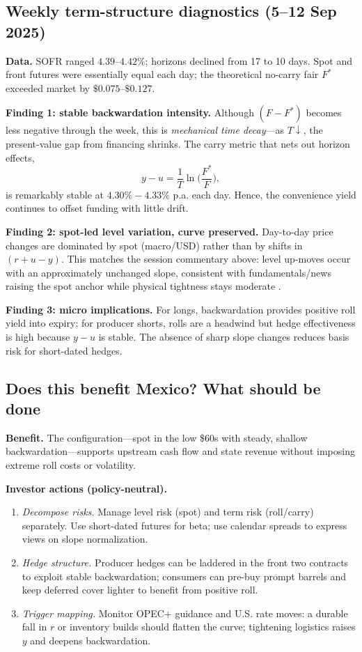 \documentclass[10pt,a4paper]{article} %
\begin{document}
\subsection{Weekly term-structure diagnostics (5–12 Sep 2025)}
\textbf{Data.} SOFR ranged \(4.39\)–\(4.42\%\); horizons declined from 17 to 10 days. Spot and front futures were essentially equal each day; the theoretical no-carry fair \(F^{*}\) exceeded market by \(\$0.075\)–\(\$0.127\).

\textbf{Finding 1: stable backwardation intensity.} Although \((F-F^{*})\) becomes less negative through the week, this is \emph{mechanical time decay}—as \(T\downarrow\), the present-value gap from financing shrinks. The carry metric that nets out horizon effects,
\[
y-u=\frac{1}{T}\ln\!\Big(\frac{F^{*}}{F}\Big),
\]
is remarkably stable at \(\mathbf{4.30\%{-}4.33\%}\) p.a. each day. Hence, the convenience yield continues to offset funding with little drift.

\textbf{Finding 2: spot-led level variation, curve preserved.} Day-to-day price changes are dominated by spot (macro/USD) rather than by shifts in \((r+u-y)\). This matches the session commentary above: level up-moves occur with an approximately unchanged slope, consistent with fundamentals/news raising the spot anchor while physical tightness stays moderate \citep{eia_prices_2023,eia_opec_2024,bis_usd_commodity_2023}.

\textbf{Finding 3: micro implications.} For longs, backwardation provides positive roll yield into expiry; for producer shorts, rolls are a headwind but hedge effectiveness is high because \(y-u\) is stable. The absence of sharp slope changes reduces basis risk for short-dated hedges.

\subsection{Does this benefit Mexico? What should be done}
\textbf{Benefit.} The configuration—spot in the low \$60s with steady, shallow backwardation—supports upstream cash flow and state revenue without imposing extreme roll costs or volatility.

\textbf{Investor actions (policy-neutral).}
\begin{enumerate}
  \item \emph{Decompose risks.} Manage level risk (spot) and term risk (roll/carry) separately. Use short-dated futures for beta; use calendar spreads to express views on slope normalization.
  \item \emph{Hedge structure.} Producer hedges can be laddered in the front two contracts to exploit stable backwardation; consumers can pre-buy prompt barrels and keep deferred cover lighter to benefit from positive roll.
  \item \emph{Trigger mapping.} Monitor OPEC+ guidance and U.S. rate moves: a durable fall in \(r\) or inventory builds should flatten the curve; tightening logistics raises \(y\) and deepens backwardation.
\end{enumerate}
\end{document}
